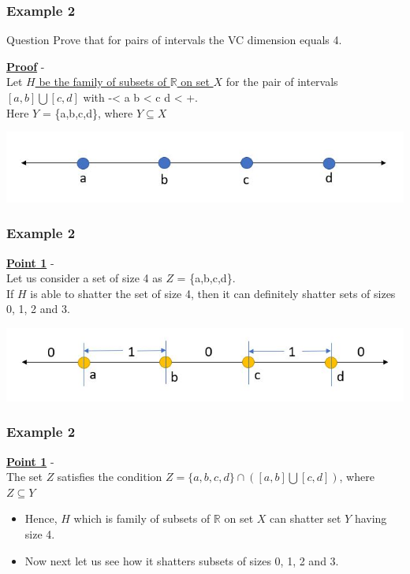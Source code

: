 \documentclass{beamer}
\begin{document}
\begin{frame}
\frametitle{Example 2}
\begin{block}{Question}
Prove that for pairs of intervals the VC dimension equals 4.
\end{block}
\textbf{\underline{Proof}} -\\
Let \underline{$H$ be the family of subsets of $\mathbb{R}$ on set $X$} for the pair of intervals $[a,b] \bigcup [c,d]$ with  -\infty < a \leq b < c \leq d < +\infty.\\
Here $Y$ = \{a,b,c,d\}, where $Y \subseteq X$
\begin{center}
    \includegraphics[scale = 0.5]{figures/Capture7.JPG}
\end{center}
\end{frame}


\begin{frame}
\frametitle{Example 2}
\textbf{\underline{Point 1}} -\\
Let us consider a set of size 4 as $Z$ = \{a,b,c,d\}.\\
If $H$ is able to shatter the set of size 4, then it can definitely shatter sets of sizes 0, 1, 2 and 3.\\
\begin{center}
    \includegraphics[scale = 0.5]{figures/Capture8.JPG}
\end{center}
\end{frame}

\begin{frame}
\frametitle{Example 2}
\textbf{\underline{Point 1}} -\\
The set $Z$ satisfies the condition $Z = \{a,b,c,d\} \cap ([a,b] \bigcup [c,d])$, where $Z \subseteq Y$\\
\begin{itemize}
    \item Hence, $H$ which is family of subsets of $\mathbb{R}$ on set $X$ can shatter set $Y$ having size 4.\\
    \item Now next let us see how it shatters subsets of sizes 0, 1, 2 and 3.
\end{itemize}
\end{frame}
\end{document}
